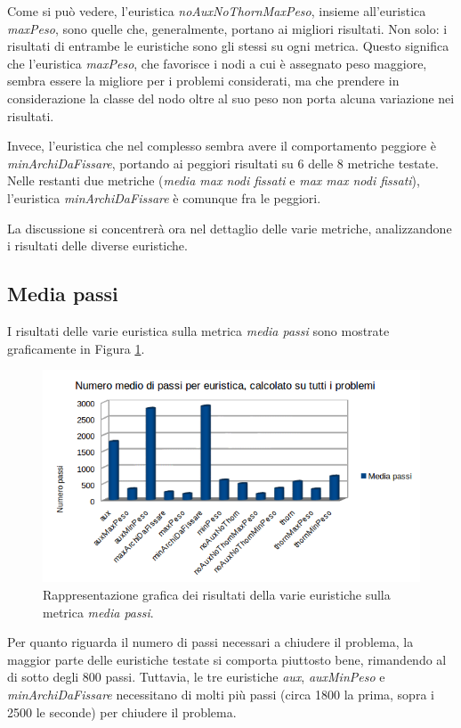 Come si può vedere, l'euristica \textit{noAuxNoThornMaxPeso}, insieme all'euristica \textit{maxPeso}, sono quelle che, generalmente, portano ai migliori risultati. Non solo: i risultati di entrambe le euristiche sono gli stessi su ogni metrica. Questo significa che l'euristica \textit{maxPeso}, che favorisce i nodi a cui è assegnato peso maggiore, sembra essere la migliore per i problemi considerati, ma che prendere in considerazione la classe del nodo oltre al suo peso non porta alcuna variazione nei risultati.

Invece, l'euristica che nel complesso sembra avere il comportamento peggiore è \textit{minArchiDaFissare}, portando ai peggiori risultati su 6 delle 8 metriche testate. Nelle restanti due metriche (\textit{media max nodi fissati} e \textit{max max nodi fissati}), l'euristica \textit{minArchiDaFissare} è comunque fra le peggiori.

La discussione si concentrerà ora nel dettaglio delle varie metriche, analizzandone i risultati delle diverse euristiche.

\subsection{Media passi}
\label{subsec:mediaPassi}
I risultati delle varie euristica sulla metrica \textit{media passi} sono mostrate graficamente in Figura \ref{fig:mediaPassi}.

\begin{figure}[H]
\includegraphics[width=\textwidth]{res/img/mediaPassi.png}
\caption{Rappresentazione grafica dei risultati della varie euristiche sulla metrica \textit{media passi}.}
\label{fig:mediaPassi}
\end{figure}

Per quanto riguarda il numero di passi necessari a chiudere il problema, la maggior parte delle euristiche testate si comporta piuttosto bene, rimandendo al di sotto degli 800 passi. Tuttavia, le tre euristiche \textit{aux}, \textit{auxMinPeso} e \textit{minArchiDaFissare} necessitano di molti più passi (circa 1800 la prima, sopra i 2500 le seconde) per chiudere il problema.


